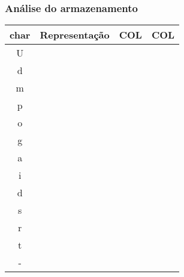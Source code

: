\documentclass[10pt, handout]{beamer}
\begin{document}
\begin{frame}[t]
    \frametitle{Análise do armazenamento}
    \begin{center}
        \begin{tabular}{c|c|c|c}
            char & Representação & COL & COL \\
            \hline
            U    &               &     &     \\
            d    &               &     &     \\
            m    &               &     &     \\
            p    &               &     &     \\
            o    &               &     &     \\
            g    &               &     &     \\
            a    &               &     &     \\
            i    &               &     &     \\
            d    &               &     &     \\
            s    &               &     &     \\
            r    &               &     &     \\
            t    &               &     &     \\
            -    &               &     &     \\
        \end{tabular}
    \end{center}

\end{frame}
\end{document}
